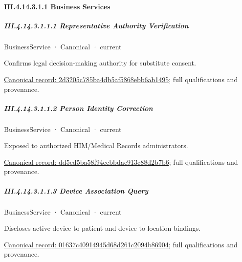 \paragraph*{III.4.14.3.1.1 Business Services}
\label{navigation:III.4.14.3.1.1}

\subparagraph*{III.4.14.3.1.1.1 Representative Authority Verification}
\label{navigation:III.4.14.3.1.1.1}

\label{element:2d3205c785ba4db5af5868ebb6ab1495}
{\small BusinessService · Canonical · current}\par

Confirms legal decision-making authority for substitute consent.


{\footnotesize \href{../../../../continuum/business/business-service/2d3205c785ba4db5af5868ebb6ab1495.md}{Canonical record: 2d3205c785ba4db5af5868ebb6ab1495}; full qualifications and provenance.}\par
\subparagraph*{III.4.14.3.1.1.2 Person Identity Correction}
\label{navigation:III.4.14.3.1.1.2}

\label{element:dd5ed5ba58f94ecbbdac913c88d2b7b6}
{\small BusinessService · Canonical · current}\par

Exposed to authorized HIM/Medical Records administrators.


{\footnotesize \href{../../../../continuum/business/business-service/dd5ed5ba58f94ecbbdac913c88d2b7b6.md}{Canonical record: dd5ed5ba58f94ecbbdac913c88d2b7b6}; full qualifications and provenance.}\par
\subparagraph*{III.4.14.3.1.1.3 Device Association Query}
\label{navigation:III.4.14.3.1.1.3}

\label{element:01637c40914945d68d261c2094b86904}
{\small BusinessService · Canonical · current}\par

Discloses active device-to-patient and device-to-location bindings.


{\footnotesize \href{../../../../continuum/business/business-service/01637c40914945d68d261c2094b86904.md}{Canonical record: 01637c40914945d68d261c2094b86904}; full qualifications and provenance.}\par
